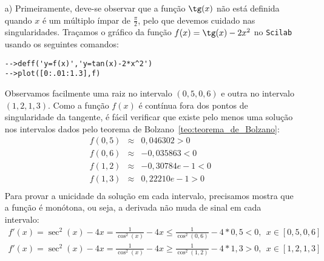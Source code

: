 \begin{resp}
  \begin{itemize}
\item[a)]Primeiramente, deve-se observar que a função $\tg(x)$ não está definida quando $x$ é um múltiplo ímpar de $\frac{\pi}{2}$, pelo que devemos cuidado nas singularidades. Traçamos o gráfico da função $f(x)=\tg(x)-2x^2$ no \verb+Scilab+ usando os seguintes comandos:
\begin{verbatim}
-->deff('y=f(x)','y=tan(x)-2*x^2')
-->plot([0:.01:1.3],f)
\end{verbatim}
Observamos facilmente uma raiz no intervalo $(0,5, 0,6)$ e outra no intervalo $(1,2, 1,3)$. Como a função $f(x)$ é contínua fora dos pontos de singularidade da tangente, é fácil verificar que existe pelo menos uma solução nos intervalos dados pelo teorema de Bolzano~\ref{teo:teorema_de_Bolzano}:
\begin{eqnarray}
f(0,5) &\approx& 0,046302 >0\\
f(0,6) &\approx& -0,035863 <0\\
f(1,2) &\approx& -0,30784e-1 <0\\
f(1,3) &\approx&  0,22210e-1>0\\
\end{eqnarray}
Para provar a unicidade da solução em cada intervalo, precisamos mostra que a função é monótona, ou seja, a derivada não muda de sinal em cada intervalo:
\begin{eqnarray}
f'(x)=\sec^2(x)-4x=\frac{1}{\cos^2(x)}-4x\leq \frac{1}{\cos^2(0,6)}-4*0,5<0, ~~x\in[ 0,5, 0,6]\\
f'(x)=\sec^2(x)-4x=\frac{1}{\cos^2(x)}-4x\geq \frac{1}{\cos^2(1,2)}-4*1,3>0, ~~x\in[ 1,2, 1,3]\\
\end{eqnarray}



\end{itemize}
\end{resp}
